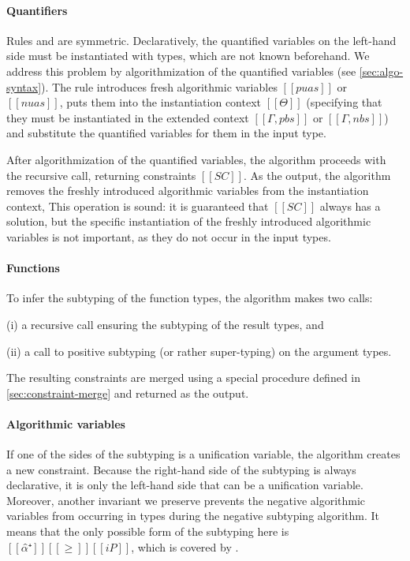 \paragraph{Quantifiers}  
Rules  and 
 are symmetric. 
Declaratively, the quantified variables on the left-hand side must 
be instantiated with types, which are not known beforehand.
We address this problem by algorithmization 
of the quantified variables (see \cref{sec:algo-syntax}).
The rule introduces fresh algorithmic variables
$[[puas]]$ or $[[nuas]]$,
puts them into the instantiation context $[[Θ]]$
(specifying that they must be instantiated in the extended context
$[[Γ, pbs]]$ or $[[Γ, nbs]]$) and substitute the quantified variables
for them in the input type. 

After algorithmization of the quantified variables, 
the algorithm proceeds with the recursive call, returning
constraints $[[SC]]$. As the output, the algorithm removes the freshly
introduced algorithmic variables from the instantiation context, This operation is
sound: it is guaranteed that $[[SC]]$ always has a solution, but the specific
instantiation of the freshly introduced algorithmic variables is not important,
as they do not occur in the input types.

\paragraph{Functions}
To infer the subtyping of the function types, the algorithm
makes two calls: 
\begin{enumerate*}
  \item[(i)] a recursive call ensuring the subtyping of the result types, and
  \item[(ii)] a call to positive subtyping (or rather super-typing) on the argument types.
\end{enumerate*}
The resulting constraints are merged
using a special procedure defined in \cref{sec:constraint-merge}
and returned as the output.

\paragraph{Algorithmic variables}
If one of the sides of the subtyping is a unification variable, the algorithm
creates a new constraint. Because the right-hand side of the subtyping is always
declarative, it is only the left-hand side that can be a unification variable.
Moreover, another invariant we preserve prevents the negative algorithmic
variables from occurring in types during the negative subtyping algorithm. It
means that the only possible form of the subtyping here is $[[α̂⁺]] [[≥]]
[[iP]]$, which is covered by .

